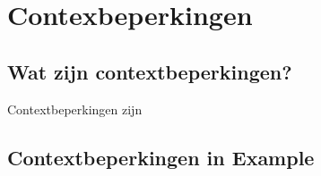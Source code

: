 \chapter{Contexbeperkingen}
\section{Wat zijn contextbeperkingen?}
Contextbeperkingen zijn 
\section{Contextbeperkingen in Example}
